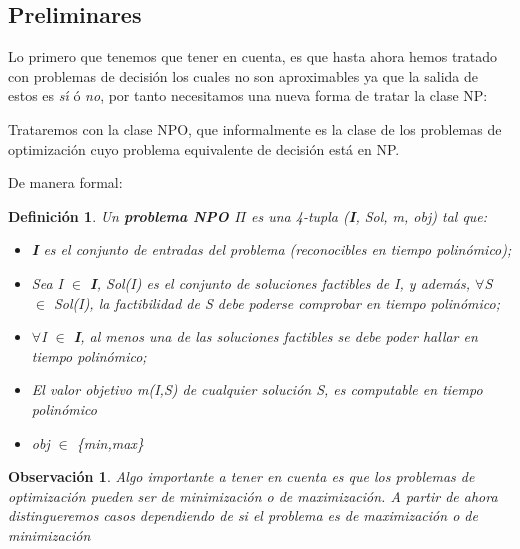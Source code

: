 \documentclass[a4paper,12pt,titlepage]{article}
\newtheorem{defi}{Definici\'on}[section]
\newtheorem{obs}{Observaci\'on}[section]
\begin{document}
\subsection{Preliminares}

Lo primero que tenemos que tener en cuenta, es que hasta ahora hemos tratado con problemas de decisi\'on los cuales no son aproximables ya que la salida de estos es \textit{s\'\i} ó \textit{no}, por tanto necesitamos una nueva forma de tratar la clase NP:

Trataremos con la clase NPO, que informalmente es la clase de los problemas de optimizaci\'on cuyo problema equivalente de decisi\'on est\'a en NP.

De manera formal:

\begin{defi}

Un \textbf{problema NPO $\Pi$} es una 4-tupla (\textbf{I}, Sol, m, obj) tal que:

\begin{itemize}

\item \textbf{I} es el conjunto de entradas del problema (reconocibles en tiempo polin\'omico);

\item Sea I $\in$ \textbf{I}, Sol(I) es el conjunto de soluciones factibles de I, y adem\'as, $\forall$S $\in$ Sol(I), la factibilidad de S debe poderse comprobar en tiempo polin\'omico;

\item $\forall$I $\in$ \textbf{I}, al menos una de las soluciones factibles se debe poder hallar en tiempo polin\'omico;

\item El valor objetivo m(I,S) de cualquier soluci\'on S, es computable en tiempo polin\'omico

\item obj $\in$ \{min,max\}

\end{itemize}

\end{defi}

\begin{obs}

Algo importante a tener en cuenta es que los problemas de optimizaci\'on pueden ser de minimizaci\'on o de maximizaci\'on. A partir de ahora distingueremos casos dependiendo de si el problema es de maximizaci\'on o de minimizaci\'on

\end{obs}
\end{document}
